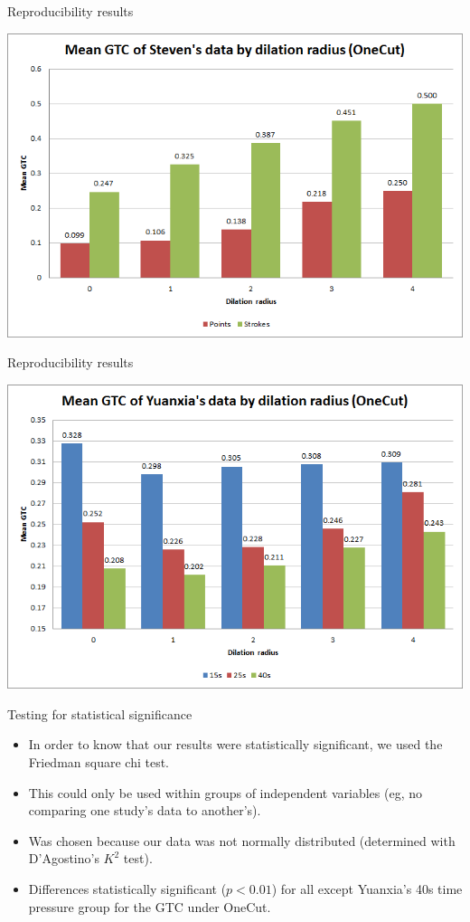 \documentclass[14pt,xcolor=dvipsnames]{beamer}
\begin{document}
\begin{frame}[fragile,t]{Reproducibility results}
	\begin{center}
		\includegraphics[width=\paperheight]{steven_onecut_gtc}
	\end{center}
\end{frame}

\begin{frame}[fragile,t]{Reproducibility results}
	\begin{center}
		\includegraphics[width=\paperheight]{yuanxia_onecut_gtc}
	\end{center}
\end{frame}

\begin{frame}[fragile,t]{Testing for statistical significance}
	\begin{itemize}
		\item In order to know that our results were statistically significant, we used the Friedman square chi test.
		\item This could only be used within groups of independent variables (eg, no comparing one study's data to another's).
		\item Was chosen because our data was not normally distributed (determined with D'Agostino's $K^2$ test).
		\item Differences statistically significant ($p < 0.01$) for all except Yuanxia's 40s time pressure group for the GTC under OneCut.
	\end{itemize}
\end{frame}
\end{document}
